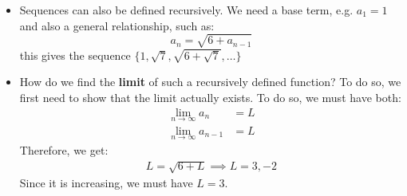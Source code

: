 \begin{itemize}
\begin{itemize}
        \item $\lim_{n\to\infty}\left(1+\frac{x}{n}\right)^n=e^x$
        \begin{proof}
            First let's deal with the $x=0$ case, which is trivial. Now:
            \begin{align}
                \ln\left(1+\frac{x}{n}\right)^n &= n\ln\left(1+\frac{x}{n}\right) \\ 
                &=\frac{x \ln(1+x/n)}{x/n} \\ 
                &= x\left(\frac{\ln(1+x/n) - \ln(1)}{x/n}\right)
            \end{align}
            Taking the limit, we have:
            \begin{align}
                \lim_{n\to\infty} \frac{\ln(1+x/h)- \ln 1}{x/h} = \lim_{h\to 0} \frac{\ln(1+h)-\ln 1}{h}
            \end{align}
            which is the first principles definition of the derivative of $\ln(x)$ at $x=1$, which gives:
            \begin{align}
                \lim_{h \to \infty} \ln(1+x/n)^n = x \cdot 1 = x \implies \lim_{n\to\infty}\left(1+\frac{x}{n}\right)^n = e^x
            \end{align}
        \end{proof}
    \end{itemize}
    \item Sequences can also be defined recursively. We need a base term, e.g. $a_1=1$ and also a general relationship, such as:
    \begin{equation}
        a_ n = \sqrt{6+a_{n-1}}
    \end{equation}
    this gives the sequence $\{1, \sqrt{7}, \sqrt{6+\sqrt{7}},\dots\}$
    \item How do we find the \textbf{limit} of such a recursively defined function? To do so, we first need to show that the limit actually exists. To do so, we must have both:
    \begin{align}
        \lim_{n\to\infty} a_n &= L \\ 
        \lim_{n\to\infty} a_{n-1} &= L
    \end{align}
    Therefore, we get:
    \begin{align}
        L = \sqrt{6 + L} \implies L=3,-2
    \end{align}
    Since it is increasing, we must have $L=3$.
\end{itemize}